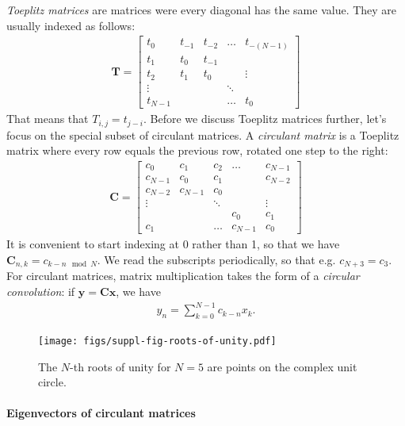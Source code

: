 \documentclass[a4paper, fontsize=9pt, twocolumn]{scrreprt}
\newcommand{\vect}[1]{\mathrm{\mathbf{#1}}}
\newcommand{\vx}{\vect x}
\newcommand{\vC}{\vect C}
\begin{document}
\emph{Toeplitz matrices} are matrices were every diagonal has the same value. 
They are usually indexed as follows:
\begin{align}
    \vect T = 
    \begin{bmatrix}
    t_0     & t_{-1}    & t_{-2}    &\dots  & t_{-(N-1)}\\
    t_1     & t_{0}     & t_{-1}    &       & \\
    t_2     & t_1       &t_0        &       & \vdots\\
    \vdots  &           &           &\ddots & \\
    t_{N-1} &           &           &\dots  &t_0
    \end{bmatrix}
\end{align}
That means that $T_{i, j} = t_{j-i}$.
Before we discuss Toeplitz matrices further, let's focus on the special subset of circulant matrices.
A \emph{circulant matrix} is a Toeplitz matrix where every row equals the previous row, rotated one step to the right:
\begin{align}
    \vC = 
    \begin{bmatrix}
        c_0     & c_1   & c_2   & \dots & c_{N-1} \\
        c_{N-1} & c_0   & c_1   &       & c_{N-2} \\
        c_{N-2} & c_{N-1} & c_0 & \\
        \vdots  &       & \ddots      &&\vdots\\
        &&&c_0&c_1\\
        c_1 &&\dots &c_{N-1}&c_0
    \end{bmatrix}
\end{align}
It is convenient to start indexing at 0 rather than 1, so that we have $\vC_{n, k} = c_{k-n \mod N}$.
We read the subscripts periodically, so that e.g. $c_{N+3} = c_3$.
For circulant matrices, matrix multiplication takes the form of a \emph{circular convolution}: if $\vect y = \vC \vx$, we have
\begin{align}
    \label{eq:circular-matrix-multiplication}
    y_n = \sum_{k=0}^{N-1} c_{k-n} x_k.
\end{align}


\begin{figure}
    \centering
    \texttt{[image: figs/suppl-fig-roots-of-unity.pdf]}
    \caption{The $N$-th roots of unity for $N=5$ are points on the complex unit circle.}
    \label{fig:roots-of-unity}
\end{figure}


\paragraph{Eigenvectors of circulant matrices}
\end{document}
